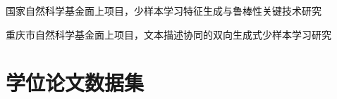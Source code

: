 
{
	\small
	\setlength{\baselineskip}{20pt}
	\begin{enumerate}[label={[\arabic*]}, leftmargin=*]
		\item 国家自然科学基金面上项目，少样本学习特征生成与鲁棒性关键技术研究
		\item 重庆市自然科学基金面上项目，文本描述协同的双向生成式少样本学习研究
	\end{enumerate}
}

\newpage
\section[\hspace{-2pt}学位论文数据集]{{\heiti{} \hspace{-8pt}学位论文数据集}}

